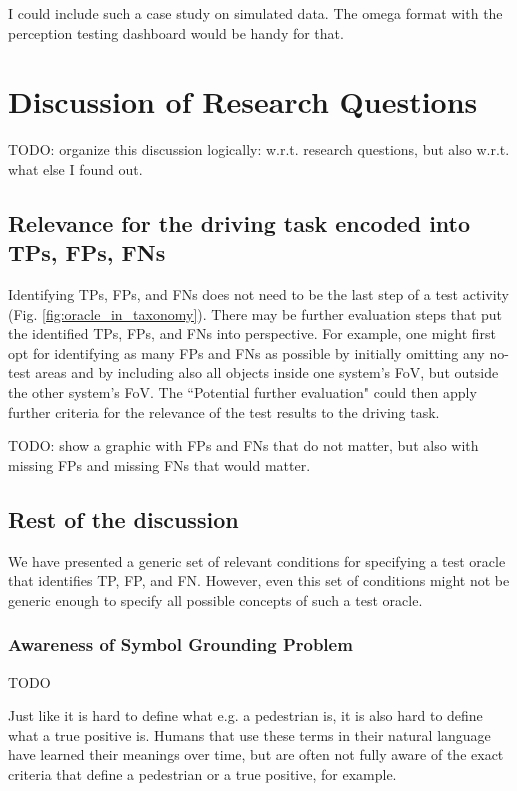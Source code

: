 \documentclass[conference]{IEEEtran}
\begin{document}
I could include such a case study on simulated data. The omega format with the perception testing dashboard would be handy for that.


\section{Discussion of Research Questions}
\label{sec:discussion}

TODO: organize this discussion logically: w.r.t. research questions, but also w.r.t. what else I found out. 

\subsection{Relevance for the driving task encoded into TPs, FPs, FNs}

Identifying TPs, FPs, and FNs does not need to be the last step of a test activity (Fig. \ref{fig:oracle_in_taxonomy}). 
There may be further evaluation steps that put the identified TPs, FPs, and FNs into perspective. 
For example, one might first opt for identifying as many FPs and FNs as possible by initially omitting any no-test areas and by including also all objects inside one system's FoV, but outside the other system's FoV. 
The ``Potential further evaluation" could then apply further criteria for the relevance of the test results to the driving task. 


TODO: show a graphic with FPs and FNs that do not matter, but also with missing FPs and missing FNs that would matter. 



\subsection{Rest of the discussion}

We have presented a generic set of relevant conditions for specifying a test oracle that identifies TP, FP, and FN. 
However, even this set of conditions might not be generic enough to specify all possible concepts of such a test oracle. 


\subsubsection{Awareness of Symbol Grounding Problem}

TODO

Just like it is hard to define what e.g. a pedestrian is, it is also hard to define what a true positive is. 
Humans that use these terms in their natural language have learned their meanings over time, but are often not fully aware of the exact criteria that define a pedestrian or a true positive, for example.  
\end{document}
